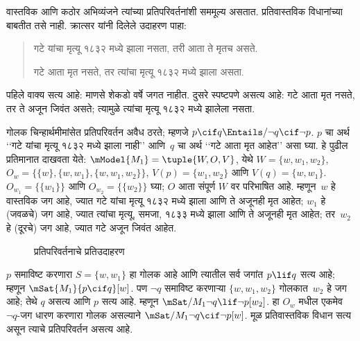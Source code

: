 \documentclass[../../../include/open-logic-section]{subfiles}
\begin{document}


वास्तविक आणि कठोर
अभिव्यंजने त्यांच्या
प्रतिपरिवर्तनांशी सममूल्य
असतात. प्रतिवास्तविक
विधानांच्या बाबतीत
तसे नाही. क्रात्सर
यांनी दिलेले उदाहरण
पाहा:
\begin{quote}
  गटे यांचा मृत्यू १८३२ मध्ये
  झाला नसता, तरी आता
  ते मृतच असते.

  गटे आता मृत नसते,
  तर त्यांचा मृत्यू
  १८३२ मध्ये झाला असता.
\end{quote}
पहिले वाक्य सत्य आहे:
माणसे शेकडो वर्षे
जगत नाहीत. दुसरे
स्पष्टपणे असत्य आहे:
गटे आता मृत नसते,
तर ते अजून जिवंत
असते; त्यामुळे
त्यांचा मृत्यू
१८३२ मध्ये
झालेला नसता.

\begin{ex}
  गोलक चिन्हार्थमीमांसेत
  प्रतिपरिवर्तन अवैध ठरते;
  म्हणजे
  $p \cif q \Entails/
  \lnot q \cif \lnot p$.
  $p$ चा अर्थ ‘‘गटे
  यांचा मृत्यू १८३२
  मध्ये झाला नाही’’
  आणि~$q$ चा अर्थ
  ‘‘गटे आता मृत
  आहेत’’ असा घ्या.
  हे पुढील प्रतिमानात
  दाखवता येते:
  $\mModel{M_1} = \tuple{W, O, V}$,
  येथे $W =
  \{w, w_1, w_2\}$,
  $O_w = \{\{w\}, \{w, w_1\},
  \{w, w_1, w_2\}\}$,
  $V(p) = \{w_1, w_2\}$
  आणि $V(q) = \{w, w_1\}$.
  $O_{w_1}=\{\{w_1\}\}$ आणि $O_{w_2}=\{\{w_2\}\}$ घ्या;
  $O$ आता संपूर्ण $W$ वर परिभाषित आहे.
  म्हणून~$w$ हे वास्तविक
  जग आहे, ज्यात गटे
  यांचा मृत्यू १८३२
  मध्ये झाला आणि
  ते अजूनही मृत आहेत;
  $w_1$ हे (जवळचे)
  जग आहे, ज्यात
  त्यांचा मृत्यू,
  समजा, १८३३ मध्ये
  झाला आणि ते
  अजूनही मृत आहेत;
  तर~$w_2$ हे
  (दूरचे) जग आहे,
  ज्यात गटे
  अजून जिवंत आहेत.
\begin{figure}
\begin{center}
\caption{प्रतिपरिवर्तनाचे प्रतिउदाहरण}
\end{center}
\end{figure}
$p$ समाविष्ट करणारा
$S = \{w, w_1\}$
हा गोलक आहे आणि
त्यातील सर्व जगांत
$p \lif q$ सत्य आहे;
म्हणून
$\mSat{M_1}{p \cif q}[w]$.
पण $\lnot q$
समाविष्ट करणाऱ्या
$\{w, w_1, w_2\}$
गोलकात~$w_2$
हे जग आहे; तेथे
$q$ असत्य आणि
$p$ सत्य आहे.
म्हणून
$\mSat/{M_1}{\lnot q
\lif \lnot p}[w_2]$. हा $O_w$ मधील एकमेव $\lnot q$-जग
धारण करणारा गोलक असल्याने
$\mSat/{M_1}{\lnot q\cif\lnot p}[w]$.
मूळ प्रतिवास्तविक विधान सत्य असून त्याचे प्रतिपरिवर्तन असत्य आहे.
\end{ex}
\end{document}
